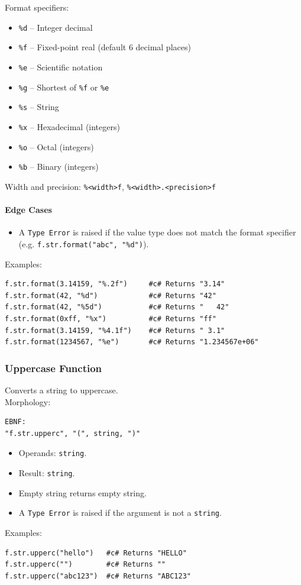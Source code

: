 Format specifiers:
\begin{itemize}
\item \texttt{\%d} -- Integer decimal
\item \texttt{\%f} -- Fixed-point real (default 6 decimal places)
\item \texttt{\%e} -- Scientific notation
\item \texttt{\%g} -- Shortest of \texttt{\%f} or \texttt{\%e}
\item \texttt{\%s} -- String
\item \texttt{\%x} -- Hexadecimal (integers)
\item \texttt{\%o} -- Octal (integers)
\item \texttt{\%b} -- Binary (integers)
\end{itemize}

Width and precision: \texttt{\%<width>f}, \texttt{\%<width>.<precision>f}

\paragraph{Edge Cases}
\begin{itemize}
\item A \texttt{Type Error} is raised if the value type does not match the format specifier (e.g. \texttt{f.str.format("abc", "\%d")}).
\end{itemize}

Examples:
\begin{verbatim}
f.str.format(3.14159, "%.2f")     #c# Returns "3.14"
f.str.format(42, "%d")            #c# Returns "42"
f.str.format(42, "%5d")           #c# Returns "   42"
f.str.format(0xff, "%x")          #c# Returns "ff"
f.str.format(3.14159, "%4.1f")    #c# Returns " 3.1"
f.str.format(1234567, "%e")       #c# Returns "1.234567e+06"
\end{verbatim}

\subsubsection{Uppercase Function}
Converts a string to uppercase. \\
Morphology:
\begin{verbatim}
EBNF:
"f.str.upperc", "(", string, ")"
\end{verbatim}
\begin{itemize}
\item Operands: \texttt{string}.
\item Result: \texttt{string}.
\item Empty string returns empty string.
\item A \texttt{Type Error} is raised if the argument is not a \texttt{string}.
\end{itemize}
Examples:
\begin{verbatim}
f.str.upperc("hello")   #c# Returns "HELLO"
f.str.upperc("")        #c# Returns ""
f.str.upperc("abc123")  #c# Returns "ABC123"
\end{verbatim}


